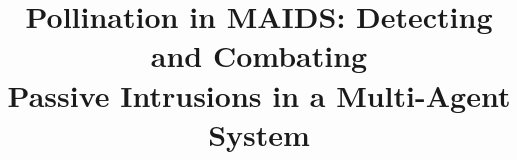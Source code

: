 \documentclass{acm_proc_article-sp}
\begin{document}
\title{Pollination in MAIDS: Detecting and Combating\\Passive Intrusions in a Multi-Agent System}
%
%
%
%
%
\end{document}
